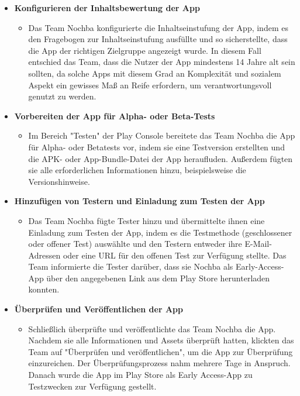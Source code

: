 \begin{itemize}
\begin{itemize}
    \end{itemize}
    \item \textbf{Konfigurieren der Inhaltsbewertung der App}
    \begin{itemize}
        \item {Das Team Nochba konfigurierte die Inhaltseinstufung der App, indem es den Fragebogen zur Inhaltseinstufung ausfüllte und so sicherstellte, dass die App der richtigen Zielgruppe angezeigt wurde. In diesem Fall entschied das Team, dass die Nutzer der App mindestens 14 Jahre alt sein sollten, da solche Apps mit diesem Grad an Komplexität und sozialem Aspekt ein gewisses Maß an Reife erfordern, um verantwortungsvoll genutzt zu werden.}
    \end{itemize}
    \item \textbf{Vorbereiten der App für Alpha- oder Beta-Tests}
    \begin{itemize}
        \item {Im Bereich "Testen" der Play Console bereitete das Team Nochba die App für Alpha- oder Betatests vor, indem sie eine Testversion erstellten und die APK- oder App-Bundle-Datei der App heraufluden. Außerdem fügten sie alle erforderlichen Informationen hinzu, beispielsweise die Versionshinweise.}
    \end{itemize}
    \item \textbf{Hinzufügen von Testern und Einladung zum Testen der App}
    \begin{itemize}
        \item {Das Team Nochba fügte Tester hinzu und übermittelte ihnen eine Einladung zum Testen der App, indem es die Testmethode (geschlossener oder offener Test) auswählte und den Testern entweder ihre E-Mail-Adressen oder eine URL für den offenen Test zur Verfügung stellte. Das Team informierte die Tester darüber, dass sie Nochba als Early-Access-App über den angegebenen Link aus dem Play Store herunterladen konnten.}
    \end{itemize}
    \item \textbf{Überprüfen und Veröffentlichen der App}
    \begin{itemize}
        \item {Schließlich überprüfte und veröffentlichte das Team Nochba die App. Nachdem sie alle Informationen und Assets überprüft hatten, klickten das Team auf "Überprüfen und veröffentlichen", um die App zur Überprüfung einzureichen. Der Überprüfungsprozess nahm mehrere Tage in Anspruch. Danach wurde die App im Play Store als Early Access-App zu Testzwecken zur Verfügung gestellt.}
    \end{itemize}
\end{itemize}
    

